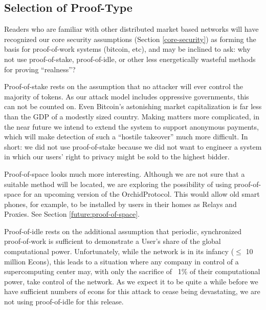 \documentclass{article}
\newcommand{\orchid}{Orchid}
\newcommand{\Orchid}{\orchid}
\begin{document}

\subsection{Selection of Proof-Type}

Readers who are familiar with other distributed market based networks will have recognized our core security assumptions (Section \ref{core-security}) as forming the basis for proof-of-work systems (bitcoin, etc), and may be inclined to ask: why not use proof-of-stake, proof-of-idle, or other less energetically wasteful methods for proving “realness”?

Proof-of-stake rests on the assumption that no attacker will ever control the majority of tokens. As our attack model includes oppressive governments, this can not be counted on. Even Bitcoin’s astonishing market capitalization is far less than the GDP of a modestly sized country. Making matters more complicated, in the near future we intend to extend the system to support anonymous payments, which will make detection of such a ``hostile takeover'' much more difficult. In short: we did not use proof-of-stake because we did not want to engineer a system in which our users’ right to privacy might be sold to the highest bidder.

Proof-of-space looks much more interesting. Although we are not sure that a suitable method will be located, we are exploring the possibility of using proof-of-space for an upcoming version of the \Orchid Protocol. This would allow old smart phones, for example, to be installed by users in their homes as Relays and Proxies. See Section \ref{future:proof-of-space}.

Proof-of-idle rests on the additional assumption that periodic, synchronized proof-of-work is sufficient to demonstrate a User’s share of the global computational power. Unfortunately, while the network is in its infancy ($\leq$ 10 million Econs), this leads to a situation where any company in control of a supercomputing center may, with only the sacrifice of ~1\% of their computational power, take control of the network. As we expect it to be quite a while before we have sufficient numbers of econs for this attack to cease being devastating, we are not using proof-of-idle for this release.
\end{document}
